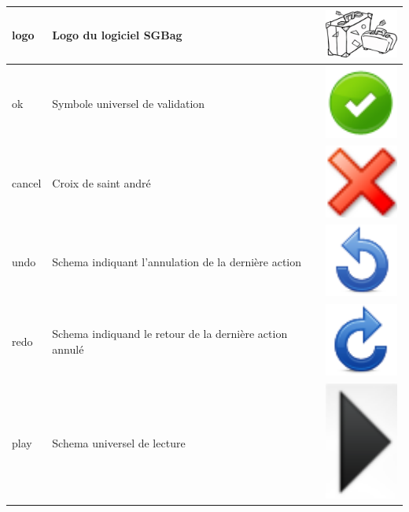 \begin{longtable}{|m{3cm}|m{9cm}|m{2.5cm}|}
\hline
logo  & Logo du logiciel SGBag & \includegraphics[width=2.5cm]{img/logo.png} \\
\hline
ok  & Symbole universel de validation & \includegraphics[width=2.5cm]{img/ok.png} \\
\hline
cancel  & Croix de saint andré & \includegraphics[width=2.5cm]{img/cancel.png} \\
\hline
undo  & Schema indiquant l'annulation de la dernière action & \includegraphics[width=2.5cm]{img/undo.png} \\
\hline
redo  & Schema indiquand le retour de la dernière action annulé & \includegraphics[width=2.5cm]{img/redo.png} \\
\hline
play  & Schema universel de lecture & \includegraphics[width=2.5cm]{img/play.png} \\

\end{longtable}
